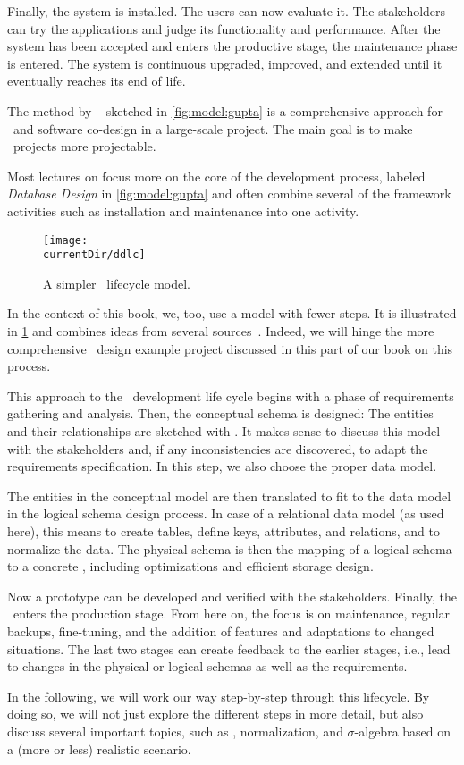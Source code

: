 Finally, the system is installed.
The users can now evaluate it.
The stakeholders can try the applications and judge its functionality and performance.
After the system has been accepted and enters the productive stage, the maintenance phase is entered.
The system is continuous upgraded, improved, and extended until it eventually reaches its end of life.

The method by \citeauthor{GMTM2011DDLC}~\cite{GMTM2011DDLC} sketched in \cref{fig:model:gupta} is a comprehensive approach for \db\ and software co-design in a large-scale project.
The main goal is to make \db\ projects more projectable.

Most lectures on  focus more on the core of the development process, labeled \emph{Database Design} in \cref{fig:model:gupta} and often combine several of the framework activities such as installation and maintenance into one activity.

\begin{figure}%
\centering%
\texttt{[image: \\currentDir/ddlc]}%
\caption{A simpler \db\ lifecycle model.}%
\label{fig:model:ddlc}%
\end{figure}%

In the context of this book, we, too, use a model with fewer steps.
It is illustrated in \cref{fig:model:ddlc} and combines ideas from several sources~\cite{SS2005EIDDDFDB:I,SS2005EIDDDFDB:CDDRAAML,D2022DN:DRA}.
Indeed, we will hinge the more comprehensive \db\ design example project discussed in this part of our book on this process.

This approach to the \db\ development life cycle begins with a phase of requirements gathering and analysis.
Then, the conceptual schema is designed:
The entities and their relationships are sketched with .
It makes sense to discuss this model with the stakeholders and, if any inconsistencies are discovered, to adapt the requirements specification.
In this step, we also choose the proper data model.

The entities in the conceptual model are then translated to fit to the data model in the logical schema design process.
In case of a relational data model (as used here), this means to create tables, define keys, attributes, and relations, and to normalize the data.
The physical schema is then the mapping of a logical schema to a concrete \dbms, including optimizations and efficient storage design.

Now a prototype can be developed and verified with the stakeholders.
Finally, the \db\ enters the production stage.
From here on, the focus is on maintenance, regular backups, fine-tuning, and the addition of features and adaptations to changed situations.
The last two stages can create feedback to the earlier stages, i.e., lead to changes in the physical or logical schemas as well as the requirements.

In the following, we will work our way step-by-step through this lifecycle.
By doing so, we will not just explore the different steps in more detail, but also discuss several important topics, such as , normalization, and $\sigma$\nobreakdashes-algebra based on a (more or less) realistic scenario.%
%
\FloatBarrier%
\endhsection%
%
\endhsection%
%
